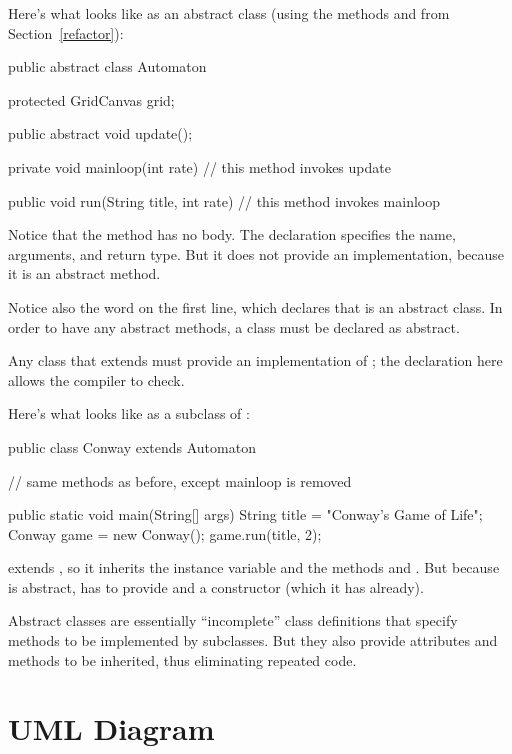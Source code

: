 Here's what  looks like as an abstract class (using the methods  and  from Section~\ref{refactor}):

\begin{code}
public abstract class Automaton {
    protected GridCanvas grid;

    public abstract void update();

    private void mainloop(int rate) {
        // this method invokes update
    }

    public void run(String title, int rate) {
        // this method invokes mainloop
    }
}
\end{code}

Notice that the  method has no body.
The declaration specifies the name, arguments, and return type.
But it does not provide an implementation, because it is an abstract method.

Notice also the word  on the first line, which declares that  is an abstract class.
In order to have any abstract methods, a class must be declared as abstract.

Any class that extends  must provide an implementation of ; the declaration here allows the compiler to check.

Here's what  looks like as a subclass of :

\begin{code}
public class Conway extends Automaton {

    // same methods as before, except mainloop is removed

    public static void main(String[] args) {
        String title = "Conway's Game of Life";
        Conway game = new Conway();
        game.run(title, 2);
    }
}
\end{code}

 extends , so it inherits the  instance variable  and the methods  and .
But because  is abstract,  has to provide  and a constructor (which it has already).

Abstract classes are essentially ``incomplete'' class definitions that specify methods to be implemented by subclasses.
But they also provide attributes and methods to be inherited, thus eliminating repeated code.


\section{UML Diagram}

